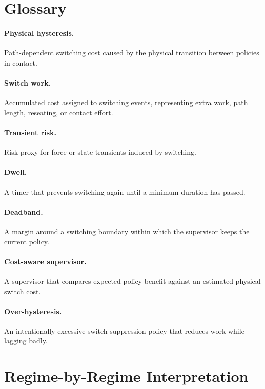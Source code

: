 \documentclass{article}
\begin{document}
\section{Glossary}

\paragraph{Physical hysteresis.}
Path-dependent switching cost caused by the physical transition between policies in contact.

\paragraph{Switch work.}
Accumulated cost assigned to switching events, representing extra work, path length, reseating, or contact effort.

\paragraph{Transient risk.}
Risk proxy for force or state transients induced by switching.

\paragraph{Dwell.}
A timer that prevents switching again until a minimum duration has passed.

\paragraph{Deadband.}
A margin around a switching boundary within which the supervisor keeps the current policy.

\paragraph{Cost-aware supervisor.}
A supervisor that compares expected policy benefit against an estimated physical switch cost.

\paragraph{Over-hysteresis.}
An intentionally excessive switch-suppression policy that reduces work while lagging badly.

\section{Regime-by-Regime Interpretation}
\end{document}
